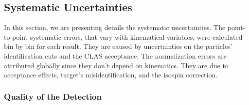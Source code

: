 

%
%

\subsection{Systematic Uncertainties}
\label{sec:TotSys}

In this section, we are presenting details the systematic uncertainties. The 
point-to-point systematic errors, that vary with kinematical variables, were 
calculated bin by bin for each result. They are caused by uncertainties on the 
particles' identification cuts and the CLAS acceptance. The normalization 
errors are attributed globally since they don't depend on kinematics. They 
are due to acceptance effects, target's misidentification, and the isospin 
correction.

\subsubsection{Quality of the Detection}
\label{SysId}

